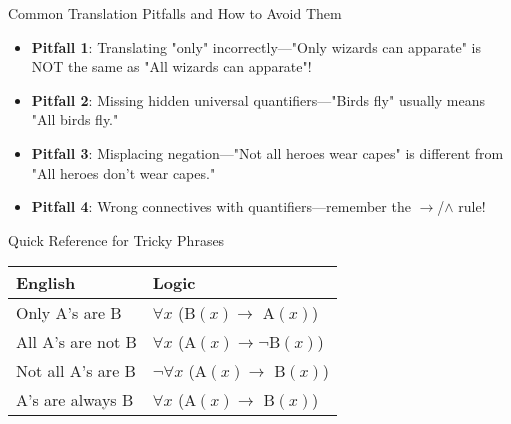 \documentclass{beamer}
\begin{document}
	\begin{frame}{Common Translation Pitfalls and How to Avoid Them}
		\begin{itemize}
			\item \textbf{Pitfall 1}: Translating "only" incorrectly—"Only wizards can apparate" is NOT the same as "All wizards can apparate"!
			\item \textbf{Pitfall 2}: Missing hidden universal quantifiers—"Birds fly" usually means "All birds fly."
			\item \textbf{Pitfall 3}: Misplacing negation—"Not all heroes wear capes" is different from "All heroes don't wear capes."
			\item \textbf{Pitfall 4}: Wrong connectives with quantifiers—remember the $\rightarrow$/$\land$ rule!
		\end{itemize}
		
		\begin{alertblock}{Quick Reference for Tricky Phrases}
			\begin{tabular}{|l|l|}
				\hline
				\textbf{English} & \textbf{Logic} \\
				\hline
				Only A's are B & $\forall x$ (B$(x) \rightarrow$ A$(x)$) \\
				All A's are not B & $\forall x$ (A$(x) \rightarrow \neg$B$(x)$) \\
				Not all A's are B & $\neg \forall x$ (A$(x) \rightarrow$ B$(x)$) \\
				A's are always B & $\forall x$ (A$(x) \rightarrow$ B$(x)$) \\
				\hline
			\end{tabular}
		\end{alertblock}
	\end{frame}
	
\end{document}
